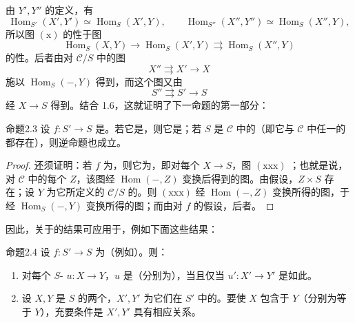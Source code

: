 由 $Y',Y''$ 的定义，有
\[
\operatorname{Hom}_{S'}(X',Y')\simeq\operatorname{Hom}_S(X',Y),\qquad
\operatorname{Hom}_{S''}(X'',Y'')\simeq\operatorname{Hom}_S(X'',Y),
\]
所以图 $(\mathrm{x})$ 的性于图
\[
\operatorname{Hom}_S(X,Y)\longrightarrow\operatorname{Hom}_S(X',Y)\rightrightarrows\operatorname{Hom}_S(X'',Y)\tag{xx}
\]
的性。后者由对 $\mathcal C/S$ 中的图
\[
 X''\rightrightarrows X'\longrightarrow X\tag{xxx}
\]
施以 $\operatorname{Hom}_S(-,Y)$ 得到，而这个图又由
\[
 S''\rightrightarrows S'\longrightarrow S
\]
经 $X\to S$ 得到。结合 1.6，这就证明了下一命题的第一部分：
\begin{SGAresult}{命题}{2.3}
设 $f:S'\to S$ 是。若它是，则它是；若 $S$ 是 $\mathcal C$ 中的（即它与 $\mathcal C$ 中任一的都存在），则逆命题也成立。
\end{SGAresult}
\begin{proof}
还须证明：若 $f$ 为，则它为，即对每个 $X\to S$，图 $(\mathrm{xxx})$ ；也就是说，对 $\mathcal C$ 中的每个 $Z$，该图经 $\operatorname{Hom}(-,Z)$ 变换后得到的图。由假设，$Z\times S$ 存在；设 $Y$ 为它所定义的 $\mathcal C/S$ 的。则 $(\mathrm{xxx})$ 经 $\operatorname{Hom}(-,Z)$ 变换所得的图，于经 $\operatorname{Hom}_S(-,Y)$ 变换所得的图；而由对 $f$ 的假设，后者。
\end{proof}
因此，关于的结果可应用于，例如下面这些结果：
\begin{SGAresult}{命题}{2.4}
设 $f:S'\to S$ 为（例如）。则：
\begin{enumerate}
\item[a)] 对每个 $S$- $u:X\to Y$，$u$ 是（分别为），当且仅当 $u':X'\to Y'$ 是如此。
\item[b)] 设 $X,Y$ 是 $S$ 的两个，$X',Y'$ 为它们在 $S'$ 中的。要使 $X$ 包含于 $Y$（分别为等于 $Y$），充要条件是 $X',Y'$ 具有相应关系。
\end{enumerate}
\end{SGAresult}
